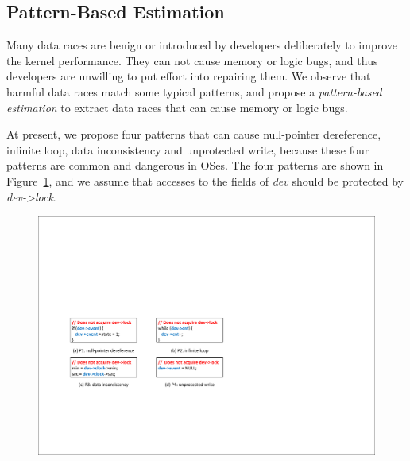 \subsection{Pattern-Based Estimation}
\label{subsec_estimation}
Many data races are benign or introduced by developers deliberately to improve 
the kernel performance. They can not cause memory or logic bugs, and thus 
developers are unwilling to put effort into repairing them. We observe that 
harmful data races match some typical patterns, and propose a {\em 
pattern-based estimation} to extract data races that can cause memory or logic 
bugs.

At present, we propose four patterns that can cause null-pointer dereference, 
infinite loop, data inconsistency and unprotected write, because these four 
patterns are common and dangerous in OSes. The four patterns are shown in 
Figure~\ref{fig_pattern}, and we assume that accesses to the fields of {\em 
dev} should be protected by {\em dev->lock}.

\begin{figure}[htbp]
	\centering
	\includegraphics[width=0.85\linewidth]{figures/fig_pattern.pdf}
	\label{fig_pattern}
\end{figure}


